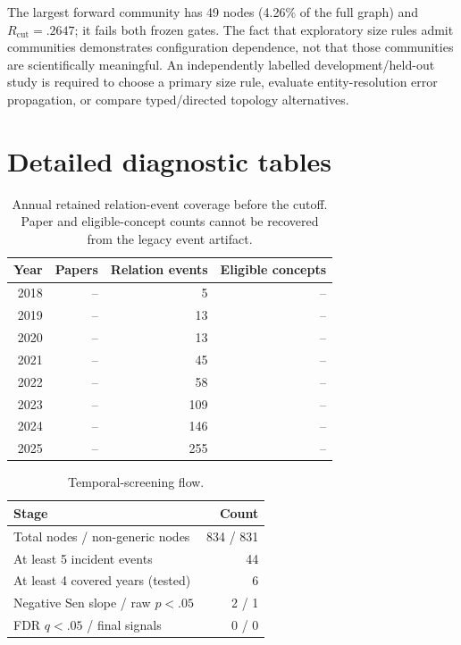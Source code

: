 \documentclass[runningheads]{llncs}
\begin{document}
The largest forward community has 49 nodes (4.26\% of the full graph) and $R_{\mathrm{cut}}=.2647$; it fails both frozen gates. The fact that exploratory size rules admit communities demonstrates configuration dependence, not that those communities are scientifically meaningful. An independently labelled development/held-out study is required to choose a primary size rule, evaluate entity-resolution error propagation, or compare typed/directed topology alternatives.

\section{Detailed diagnostic tables}
\begin{table}[h]
\caption{Annual retained relation-event coverage before the cutoff. Paper and eligible-concept counts cannot be recovered from the legacy event artifact.}
\centering
\begin{tabular}{rrrr}
\toprule
Year & Papers & Relation events & Eligible concepts\\
\midrule
2018 & -- & 5 & --\\
2019 & -- & 13 & --\\
2020 & -- & 13 & --\\
2021 & -- & 45 & --\\
2022 & -- & 58 & --\\
2023 & -- & 109 & --\\
2024 & -- & 146 & --\\
2025 & -- & 255 & --\\
\bottomrule
\end{tabular}
\end{table}

\begin{table}[h]
\caption{Temporal-screening flow.}
\centering
\begin{tabular}{lr}
\toprule
Stage & Count\\
\midrule
Total nodes / non-generic nodes & 834 / 831\\
At least 5 incident events & 44\\
At least 4 covered years (tested) & 6\\
Negative Sen slope / raw $p<.05$ & 2 / 1\\
FDR $q<.05$ / final signals & 0 / 0\\
\bottomrule
\end{tabular}
\end{table}
\end{document}
